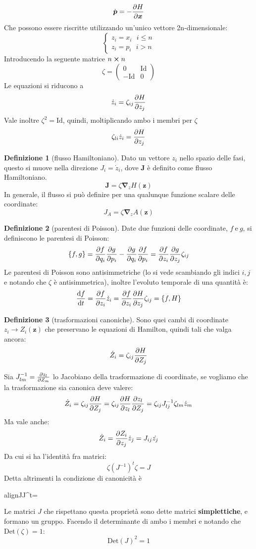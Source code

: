 \documentclass[a4paper,12pt]{article}
\newcommand{\boxedeq}[2]{\begin{empheq}[box={\fboxsep=6pt\fbox}]{align}\label{#1}#2\end{empheq}}
\theoremstyle{plain}
\renewcommand{\vec}[1]{{\boldsymbol{#1}}}
\theoremstyle{definition}
\newtheorem{defn}{Definizione}[section]
\newcommand{\econg}{~\text{e}~}
\renewcommand{\unit}{\text{Id}}
\newcommand{\pos}{\vec{x}}
\newcommand{\mom}{\vec{p}}
\theoremstyle{remark}
\begin{document}
\[\dot{\mom}=-\pdv{H}{\pos}			\]
Che possono essere riscritte utilizzando un'unico vettore 2n-dimensionale:
\[\begin{cases}
	z_i=x_i \:\:\:i\le n\\
z_i=p_i \:\:\:i> n
\end{cases}\]
Introducendo la seguente matrice  $n\cross n$ \[\zeta=\begin{pmatrix}
0&\unit\\
-\unit&0
\end{pmatrix}\]
Le equazioni si riducono a \[\dot{z}_i=\zeta_{ij}\pdv{H}{z_j}\]
Vale inoltre $\zeta^2=\unit$, quindi, moltiplicando ambo i membri per $\zeta$
\[\zeta_{li}\dot{z}_i=\pdv{H}{z_j}\]
\begin{defn}[flusso Hamiltoniano]\label{flux}
	Dato un vettore $z_i$ nello spazio delle fasi, questo si muove nella direzione $J_i=\dot{z}_i$, dove $\vec{J}$ è definito come flusso Hamiltoniano. 
	\[\vec{J}=\zeta\vec{\nabla}_z	H(\vec{z})	\]
	In generale, il flusso si può definire per una qualunque funzione scalare delle coordinate: 
	\[J_A=\zeta\vec{\nabla}_z	A(\vec{z})\]
\end{defn}
\begin{defn}[parentesi di Poisson]
	Date due funzioni delle coordinate, $f\econg g$, si definiscono le parentesi di Poisson:
	\[\{f,g\}=\pdv{f}{q_i}\pdv{g}{p_i}-\pdv{g}{q_i}\pdv{f}{p_i}=\pdv{f}{z_i}\pdv{g}{z_j}	\zeta_{ij}\]
	Le parentesi di Poisson sono antisimmetriche (lo si vede scambiando gli indici $i,j$ e notando che $\zeta$ è antisimmetrica), inoltre l'evoluto temporale di una quantità è:
	\[	\dv{f}{t}=\pdv{f}{z_i}\dot{z}_i=\pdv{f}{z_i}\pdv{H}{z_j}\zeta_{ij}=\{f,H\}	\]
\end{defn}
	
\begin{defn}[trasformazioni canoniche]
Sono quei cambi di coordinate $z_i\rightarrow Z_i(\vec{z})$ che preservano le equazioni di Hamilton, quindi tali che valga ancora:
\[\dot{Z}_i=\zeta_{ij}\pdv{H}{Z_j}\]
\end{defn}
Sia $J^{-1}_{lm}=\pdv{z_l}{Z_m}$ lo Jacobiano della trasformazione di coordinate, se vogliamo che la trasformazione sia canonica deve valere:
\[\dot{Z}_i=\zeta_{ij}\pdv{H}{Z_j}=\zeta_{ij}\pdv{H}{z_l}\pdv{z_l}{Z_j}=\zeta_{ij}J^{-1}_{lj}\zeta_{lm} \dot{z}_m		\]
Ma vale anche:
\[\dot{Z}_i=\pdv{Z_i}{z_j}\dot{z}_j=J_{ij}\dot{z_j}	\]
Da cui si ha l'identità fra matrici:
\[\zeta \left(J^{-1}\right)^t \zeta=J		\]
Detta altrimenti la condizione di canonicità è
\boxedeq{canonical}{J\zeta J^t=\zeta}
Le matrici $J$ che rispettano questa proprietà sono dette matrici \textbf{simplettiche}, e formano un gruppo.
Facendo il determinante di ambo i membri e notando che  $\text{Det}(\zeta
)=1$:
\[\text{Det}(J)^2=1\]
\end{document}
